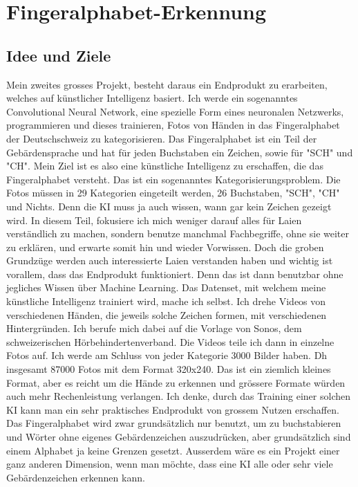 \documentclass[11pt,a4paper,ngerman]{article}
\begin{document}
\pagebreak
\section{Fingeralphabet-Erkennung}

\subsection{Idee und Ziele}

Mein zweites grosses Projekt, besteht daraus ein Endprodukt zu erarbeiten, welches auf künstlicher Intelligenz basiert. Ich werde ein sogenanntes Convolutional Neural Network, eine spezielle Form eines neuronalen Netzwerks, programmieren und dieses trainieren, Fotos von Händen in das Fingeralphabet der Deutschschweiz zu kategorisieren. Das Fingeralphabet ist ein Teil der Gebärdensprache und hat für jeden Buchstaben ein Zeichen, sowie für "SCH" und "CH". Mein Ziel ist es also eine künstliche Intelligenz zu erschaffen, die das Fingeralphabet versteht. Das ist ein sogenanntes Kategorisierungsproblem. Die Fotos müssen in 29 Kategorien eingeteilt werden, 26 Buchstaben, "SCH", "CH" und Nichts. Denn die KI muss ja auch wissen, wann gar kein Zeichen gezeigt wird. In diesem Teil, fokusiere ich mich weniger darauf alles für Laien verständlich zu machen, sondern benutze manchmal Fachbegriffe, ohne sie weiter zu erklären, und erwarte somit hin und wieder Vorwissen. Doch die groben Grundzüge werden auch interessierte Laien verstanden haben und wichtig ist vorallem, dass das Endprodukt funktioniert. Denn das ist dann benutzbar ohne jegliches Wissen über Machine Learning. Das Datenset, mit welchem meine künstliche Intelligenz trainiert wird, mache ich selbst. Ich drehe Videos von verschiedenen Händen, die jeweils solche Zeichen formen, mit verschiedenen Hintergründen. Ich berufe mich dabei auf die Vorlage von Sonos, dem schweizerischen Hörbehindertenverband. Die Videos teile ich dann in einzelne Fotos auf. Ich werde am Schluss von jeder Kategorie 3000 Bilder haben. Dh insgesamt 87000 Fotos mit dem Format 320x240. Das ist ein ziemlich kleines Format, aber es reicht um die Hände zu erkennen und grössere Formate würden auch mehr Rechenleistung verlangen. Ich denke, durch das Training einer solchen KI kann man ein sehr praktisches Endprodukt von grossem Nutzen erschaffen. Das Fingeralphabet wird zwar grundsätzlich nur benutzt, um zu buchstabieren und Wörter ohne eigenes Gebärdenzeichen auszudrücken, aber grundsätzlich sind einem Alphabet ja keine Grenzen gesetzt. Ausserdem wäre es ein Projekt einer ganz anderen Dimension, wenn man möchte, dass eine KI alle oder sehr viele Gebärdenzeichen erkennen kann. 
\end{document}
